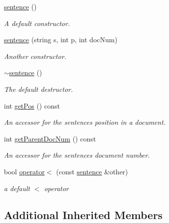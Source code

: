 \begin{DoxyCompactItemize}
\item 
\hyperlink{classsentence_a458e5abe0d27f8972771153e72667673}{sentence} ()
\begin{DoxyCompactList}\small\item\em A default constructor. \end{DoxyCompactList}\item 
\hyperlink{classsentence_a39e99adb96c8de8aeff00c0657248f9e}{sentence} (string s, int p, int doc\+Num)
\begin{DoxyCompactList}\small\item\em Another constructor. \end{DoxyCompactList}\item 
\mbox{\label{classsentence_affdf5776454bd6796aac043ff8b9630e}} 
\hyperlink{classsentence_affdf5776454bd6796aac043ff8b9630e}{$\sim$sentence} ()
\begin{DoxyCompactList}\small\item\em The default destructor. \end{DoxyCompactList}\item 
int \hyperlink{classsentence_ad4786351fceabfd06ca10b7766d516b3}{get\+Pos} () const
\begin{DoxyCompactList}\small\item\em An accessor for the sentence\textquotesingle{}s position in a document. \end{DoxyCompactList}\item 
int \hyperlink{classsentence_a6b8b9942e1a30a75ca2308d6b71fb24d}{get\+Parent\+Doc\+Num} () const
\begin{DoxyCompactList}\small\item\em An accessor for the sentence\textquotesingle{}s document number. \end{DoxyCompactList}\item 
bool \hyperlink{classsentence_ae4cbc4603c414be42f68131e243e1bed}{operator$<$} (const \hyperlink{classsentence}{sentence} \&other)
\begin{DoxyCompactList}\small\item\em a default $<$ operator \end{DoxyCompactList}\end{DoxyCompactItemize}
\subsection*{Additional Inherited Members}


